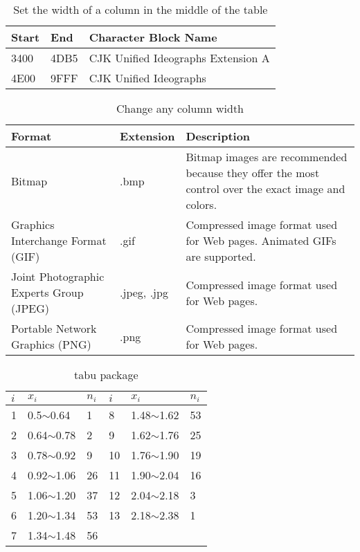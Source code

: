 \documentclass{article}
\begin{document}
\begin{table}
\caption{Set the width of a column in the middle of the table}
\begin{tabularx}{12cm}{lXl}
\hline
Start & End  & Character Block Name \\
\hline
3400  & 4DB5 & CJK Unified Ideographs Extension A \\
4E00  & 9FFF & CJK Unified Ideographs \\
\hline
\end{tabularx}
\end{table}


\begin{table}[ht] %
\caption{Change any column width} %
\begin{tabular}{p{3.5cm}|p{2cm}|p{5cm}} %
\hline
\hline
Format & Extension & Description \\ %
\hline %
Bitmap & .bmp & Bitmap images are recommended because they offer the most control over the exact image and colors.\\
\hline
Graphics Interchange Format (GIF) & .gif & Compressed image format used for Web pages. Animated GIFs are supported.\\
\hline
Joint Photographic Experts Group (JPEG) & .jpeg, .jpg & Compressed image format used for Web pages.\\
\hline
Portable Network Graphics (PNG) & .png & Compressed image format used for Web pages.\\
\hline
\hline
\end{tabular}
\end{table}

\begin{table}
\caption{tabu package}
\begin{center}
\begin{tabu} to 0.8\textwidth{X[c]|X[3,b]|X[2,l]|X[c]|X[3,m]|X[1,c]}
\hline
$i$  &$x_i$              &$n_i$      &$i$    &$x_i$               &$n_i$\\
    &0.5$\sim$0.64       &1           &8    &1.48$\sim$1.62      &53\\
2    &0.64$\sim$0.78      &2           &9    &1.62$\sim$1.76      &25\\
3    &0.78$\sim$0.92      &9           &10   &1.76$\sim$1.90      &19\\
4    &0.92$\sim$1.06      &26          &11   &1.90$\sim$2.04      &16\\
5    &1.06$\sim$1.20      &37          &12   &2.04$\sim$2.18      &3\\
6    &1.20$\sim$1.34      &53          &13   &2.18$\sim$2.38      &1\\
7    &1.34$\sim$1.48      &56          &     &                    & \\
\hline
\end{tabu}
\end{center}
\end{table}
\end{document}

